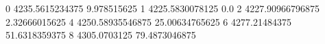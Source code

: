 0 4235.5615234375 9.978515625
1 4225.5830078125 0.0
2 4227.90966796875 2.32666015625
4 4250.58935546875 25.00634765625
6 4277.21484375 51.6318359375
8 4305.0703125 79.4873046875
